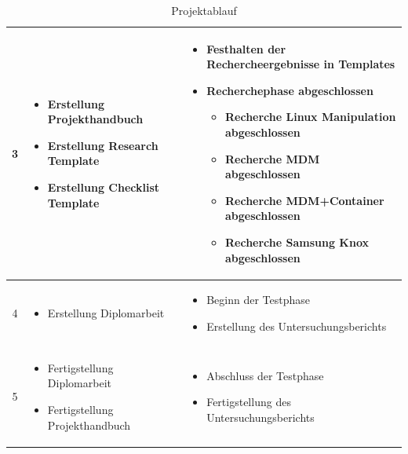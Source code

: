 \begin{table}
\begin{tabular}{| c | p{6cm} | p{7cm} |}
		\\\hline %
		3
		&%
		\begin{itemize}
			\item Erstellung Projekthandbuch
			\item Erstellung Research Template
			\item Erstellung Checklist Template
		\end{itemize}
		&%
		\begin{itemize}
			\item Festhalten der Rechercheergebnisse in Templates
			\item Recherchephase abgeschlossen
			\begin{itemize}
				\item Recherche Linux Manipulation abgeschlossen
				\item Recherche MDM abgeschlossen
				\item Recherche MDM+Container abgeschlossen
				\item Recherche Samsung Knox abgeschlossen
			\end{itemize}
		\end{itemize}
		\\\hline %
		4
		&%
		\begin{itemize}
			\item Erstellung Diplomarbeit
		\end{itemize}
		&%
		\begin{itemize}
			\item Beginn der Testphase
			\item Erstellung des Untersuchungsberichts
		\end{itemize}
		\\\hline %
		5
		&%
		\begin{itemize}
			\item Fertigstellung Diplomarbeit
			\item Fertigstellung Projekthandbuch
		\end{itemize}
		&%
		\begin{itemize}
			\item Abschluss der Testphase
			\item Fertigstellung des Untersuchungsberichts
		\end{itemize}
		\\\hline %
	\end{tabular}
	\caption{Projektablauf}
\end{table}





	